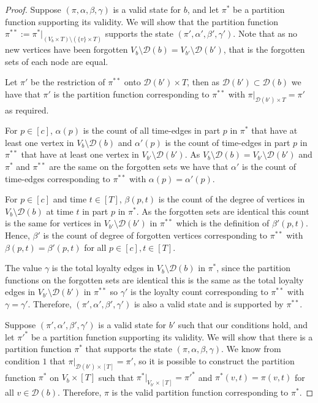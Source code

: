 \documentclass[runningheads]{llncs}
\begin{document}
\begin{proof}
 Suppose $(\pi,\alpha,\beta,\gamma)$ is a valid state for $b$, and let $\pi^*$ be a partition function supporting its validity. We will show that the partition function $\pi^{**}:=\pi^*|_{(V_b\times T)\setminus (\{v\}\times T)}$ supports the state $(\pi',\alpha',\beta',\gamma')$.
 Note that as no new vertices have been forgotten $V_b\setminus \mathcal{D}(b)=V_{b'}\setminus \mathcal{D}(b')$, that is the forgotten sets of each node are equal.
 
Let $\pi'$ be the restriction of $\pi^{**}$ onto $\mathcal{D}(b')\times T$, then as $\mathcal{D}(b')\subset \mathcal{D}(b)$ we have that $\pi'$ is the partition function corresponding to $\pi^{**}$ with $\pi| _{\mathcal{D}(b')\times T}=\pi'$ as required.
    
For $p \in [c]$, $\alpha(p)$ is the count of all time-edges in part $p$ in $\pi^*$ that have at least one vertex in $V_b\setminus \mathcal{D}(b)$ and $\alpha'(p)$ is the count of time-edges in part $p$ in $\pi^{**}$ that have at least one vertex in $V_{b'} \setminus \mathcal{D}(b')$. As $V_b\setminus \mathcal{D}(b)=V_{b'}\setminus \mathcal{D}(b')$ and $\pi^{*}$ and $\pi^{**}$ are the same on the forgotten sets we have that $\alpha'$ is the count of time-edges corresponding to $\pi^{**}$  with $\alpha(p)=\alpha'(p).$
    
For $p \in [c]$ and time $t\in [T]$,  $\beta(p,t)$ is the count of the degree of vertices in $V_{b}\setminus \mathcal{D}(b)$ at time $t$ in part $p$ in $\pi^*$. As the forgotten sets are identical this count is the same for vertices in $V_{b'}\setminus \mathcal{D}(b')$ in $\pi^{**}$ which is the definition of $\beta'(p,t)$.
Hence, $\beta'$ is the count of degree of forgotten vertices corresponding to $\pi^{**}$ with $\beta(p,t)=\beta'(p,t)$ for all $p \in [c], t \in [T]$.
    
The value $\gamma$ is the total loyalty edges in $V_{b}\setminus \mathcal{D}(b)$ in $\pi^*$, since the partition functions on the forgotten sets are identical this is the same as the total loyalty edges in $V_{b'}\setminus \mathcal{D}(b')$ in $\pi^{**}$ so $\gamma'$ is the loyalty count corresponding to $\pi^{**}$ with $\gamma=\gamma'$.
Therefore, $(\pi',\alpha',\beta',\gamma')$ is also a valid state and is supported by $\pi^{**}$.

 Suppose $(\pi',\alpha',\beta',\gamma')$ is a valid state for $b'$ such that our conditions hold, and let $\pi'^*$ be a partition function supporting its validity. 
     We will show that there is a partition function $\pi^*$ that supports the state $(\pi,\alpha,\beta,\gamma)$.
    We know from condition $1$ that $\pi| _{\mathcal{D}(b')\times [T]}=\pi'$, so it is possible to construct the partition function $\pi^*$ on $V_b \times [T]$ such that $\pi^*|_{V_{b'}\times[T]}=\pi'^*$ and $\pi^*(v,t)=\pi(v,t)$ for all $v \in \mathcal{D}(b)$. Therefore, $\pi$ is the valid partition function corresponding to $\pi^{*}$.


\end{proof}
\end{document}
